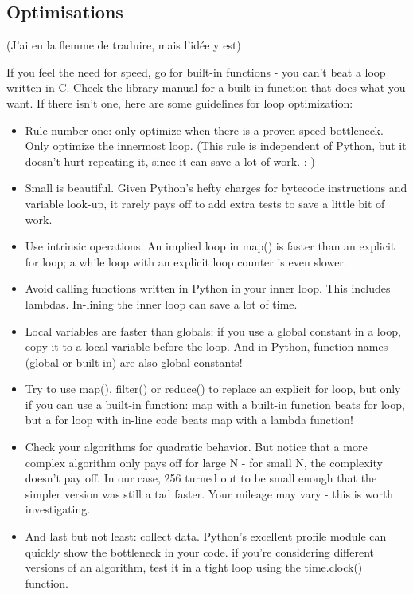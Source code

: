 \documentclass[a4paper,twoside]{article}
\begin{document}
\subsection{Optimisations}
(J'ai eu la flemme de traduire, mais l'idée y est)

If you feel the need for speed, go for built-in functions - you can't beat a loop written in C. Check the library manual for a built-in function that does what you want. If there isn't one, here are some guidelines for loop optimization:

\begin{itemize}
\item Rule number one: only optimize when there is a proven speed bottleneck. Only optimize the innermost loop. (This rule is independent of Python, but it doesn't hurt repeating it, since it can save a lot of work. :-)
\item Small is beautiful. Given Python's hefty charges for bytecode instructions and variable look-up, it rarely pays off to add extra tests to save a little bit of work.
\item Use intrinsic operations. An implied loop in map() is faster than an explicit for loop; a while loop with an explicit loop counter is even slower.
\item Avoid calling functions written in Python in your inner loop. This includes lambdas. In-lining the inner loop can save a lot of time.
\item Local variables are faster than globals; if you use a global constant in a loop, copy it to a local variable before the loop. And in Python, function names (global or built-in) are also global constants!
\item Try to use map(), filter() or reduce() to replace an explicit for loop, but only if you can use a built-in function: map with a built-in function beats for loop, but a for loop with in-line code beats map with a lambda function!
\item Check your algorithms for quadratic behavior. But notice that a more complex algorithm only pays off for large N - for small N, the complexity doesn't pay off. In our case, 256 turned out to be small enough that the simpler version was still a tad faster. Your mileage may vary - this is worth investigating.
\item And last but not least: collect data. Python's excellent profile module can quickly show the bottleneck in your code. if you're considering different versions of an algorithm, test it in a tight loop using the time.clock() function. 
\end{itemize}
\end{document}

